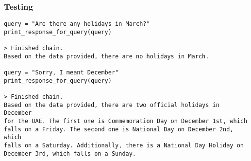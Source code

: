 \begin{frame}[fragile]\frametitle{Testing}


  
\begin{lstlisting}
query = "Are there any holidays in March?"
print_response_for_query(query)

> Finished chain.
Based on the data provided, there are no holidays in March.

query = "Sorry, I meant December"
print_response_for_query(query)

> Finished chain.
Based on the data provided, there are two official holidays in December 
for the UAE. The first one is Commemoration Day on December 1st, which 
falls on a Friday. The second one is National Day on December 2nd, which 
falls on a Saturday. Additionally, there is a National Day Holiday on 
December 3rd, which falls on a Sunday.
\end{lstlisting}	  


\end{frame}



